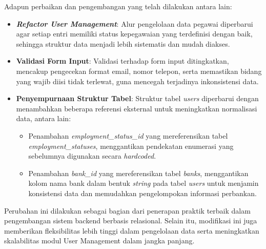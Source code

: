 Adapun perbaikan dan pengembangan yang telah dilakukan antara lain:
\begin{itemize}
    \item \textbf{\textit{Refactor User Management}}: Alur pengelolaan data pegawai diperbarui agar setiap entri memiliki status kepegawaian yang terdefinisi dengan baik, sehingga struktur data menjadi lebih sistematis dan mudah diakses.
    \item \textbf{Validasi Form Input}: Validasi terhadap form input ditingkatkan, mencakup pengecekan format email, nomor telepon, serta memastikan bidang yang wajib diisi tidak terlewat, guna mencegah terjadinya inkonsistensi data.
    \item \textbf{Penyempurnaan Struktur Tabel}: Struktur tabel \textit{users} diperbarui dengan menambahkan beberapa referensi eksternal untuk meningkatkan normalisasi data, antara lain:
    \begin{itemize}
        \item Penambahan \textit{employment\_status\_id} yang mereferensikan tabel \textit{employment\_statuses}, menggantikan pendekatan enumerasi yang sebelumnya digunakan secara \textit{hardcoded}.
        \item Penambahan \textit{bank\_id} yang mereferensikan tabel \textit{banks}, menggantikan kolom nama bank dalam bentuk \textit{string} pada tabel \textit{users} untuk menjamin konsistensi data dan memudahkan pengelompokan informasi perbankan.
    \end{itemize}
\end{itemize}

Perubahan ini dilakukan sebagai bagian dari penerapan praktik terbaik dalam pengembangan sistem backend berbasis relasional. Selain itu, modifikasi ini juga memberikan fleksibilitas lebih tinggi dalam pengelolaan data serta meningkatkan skalabilitas modul User Management dalam jangka panjang.

